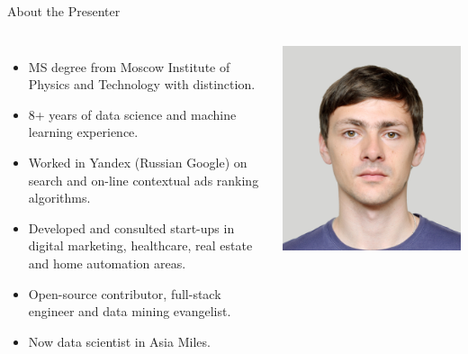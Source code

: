 \documentclass[unicode, notheorems]{beamer}
\begin{document}
\begin{frame}{About the Presenter}

\begin{columns}
  {\footnotesize 
    \begin{itemize}
    \item MS degree from Moscow Institute of Physics and Technology with distinction.
    \item 8+ years of data science and machine learning experience.
    \item Worked in Yandex (Russian Google) on search and on-line contextual ads ranking algorithms.
    \item Developed and consulted start-ups in digital marketing, healthcare, real estate and home automation areas.
    \item Open-source contributor, full-stack engineer and data mining evangelist.
    \item Now data scientist in Asia Miles.
    \end{itemize}
  }
	\includegraphics[scale=0.8]{images/author}
\end{columns}
\end{frame}
\end{document}
